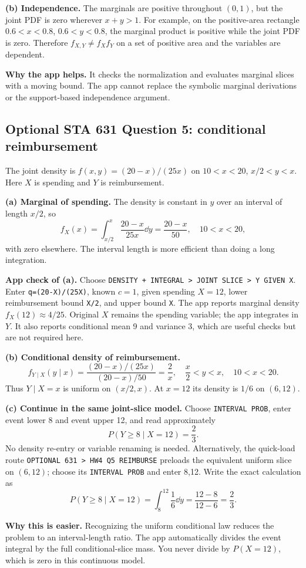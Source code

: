 \textbf{(b) Independence.} The marginals are positive throughout $(0,1)$, but the joint PDF is zero wherever $x+y>1$. For example, on the positive-area rectangle $0.6<x<0.8$, $0.6<y<0.8$, the marginal product is positive while the joint PDF is zero. Therefore $f_{X,Y}\ne f_Xf_Y$ on a set of positive area and the variables are dependent.

\textbf{Why the app helps.} It checks the normalization and evaluates marginal slices with a moving bound. The app cannot replace the symbolic marginal derivations or the support-based independence argument.

\clearpage
\subsection{Optional STA 631 Question 5: conditional reimbursement}
The joint density is $f(x,y)=(20-x)/(25x)$ on $10<x<20$, $x/2<y<x$. Here $X$ is spending and $Y$ is reimbursement.

\textbf{(a) Marginal of spending.} The density is constant in $y$ over an interval of length $x/2$, so
\[
\boxed{f_X(x)=\int_{x/2}^x\frac{20-x}{25x}\dd y
=\frac{20-x}{50},\quad10<x<20,}
\]
with zero elsewhere. The interval length is more efficient than doing a long integration.

\textbf{App check of (a).} Choose \texttt{DENSITY + INTEGRAL > JOINT SLICE > Y GIVEN X}. Enter \texttt{q=(20-X)/(25X)}, known $c=1$, given spending $X=12$, lower reimbursement bound \texttt{X/2}, and upper bound \texttt{X}. The app reports marginal density $f_X(12)\approx4/25$. Original $X$ remains the spending variable; the app integrates in $Y$. It also reports conditional mean 9 and variance 3, which are useful checks but are not required here.

\textbf{(b) Conditional density of reimbursement.}
\[
\boxed{f_{Y\mid X}(y\mid x)=\frac{(20-x)/(25x)}{(20-x)/50}
=\frac2x,\quad\frac x2<y<x,\quad10<x<20.}
\]
Thus $Y\mid X=x$ is uniform on $(x/2,x)$. At $x=12$ its density is $1/6$ on $(6,12)$.

\textbf{(c) Continue in the same joint-slice model.} Choose \texttt{INTERVAL PROB}, enter event lower 8 and event upper 12, and read approximately
\[
\boxed{P(Y\ge8\mid X=12)=\frac23.}
\]
No density re-entry or variable renaming is needed. Alternatively, the quick-load route \texttt{OPTIONAL 631 > HW4 Q5 REIMBURSE} preloads the equivalent uniform slice on $(6,12)$; choose its \texttt{INTERVAL PROB} and enter 8,12.
Write the exact calculation as
\[
P(Y\ge8\mid X=12)=\int_8^{12}\frac16\dd y
=\frac{12-8}{12-6}=\frac23.
\]

\textbf{Why this is easier.} Recognizing the uniform conditional law reduces the problem to an interval-length ratio. The app automatically divides the event integral by the full conditional-slice mass. You never divide by $P(X=12)$, which is zero in this continuous model.
